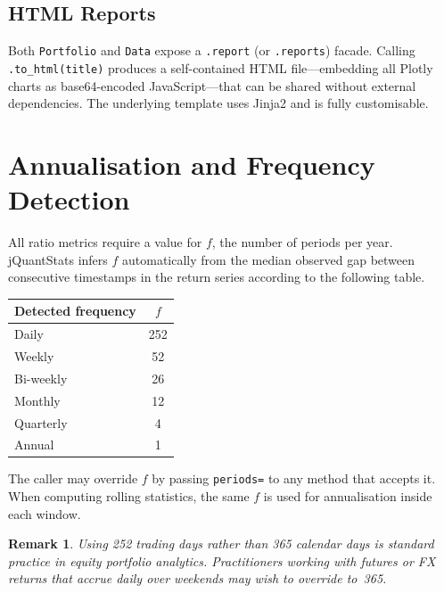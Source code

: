 \documentclass[11pt,a4paper]{article}
\newtheorem{remark}{Remark}
\begin{document}
\subsection{HTML Reports}

Both \texttt{Portfolio} and \texttt{Data} expose a \texttt{.report} (or
\texttt{.reports}) facade.  Calling \texttt{.to\_html(title)} produces a
self-contained HTML file—embedding all Plotly charts as base64-encoded
JavaScript—that can be shared without external dependencies.  The underlying
template uses Jinja2 and is fully customisable.

\section{Annualisation and Frequency Detection}
\label{sec:annualisation}

All ratio metrics require a value for $f$, the number of periods per year.
jQuantStats infers $f$ automatically from the median observed gap between
consecutive timestamps in the return series according to the following table.

\begin{center}
\begin{tabular}{@{}lc@{}}
\toprule
Detected frequency & $f$ \\
\midrule
Daily         & 252 \\
Weekly        & 52  \\
Bi-weekly     & 26  \\
Monthly       & 12  \\
Quarterly     & 4   \\
Annual        & 1   \\
\bottomrule
\end{tabular}
\end{center}

The caller may override $f$ by passing \texttt{periods=} to any method that
accepts it.  When computing rolling statistics, the same $f$ is used for
annualisation inside each window.

\begin{remark}
Using 252 trading days rather than 365 calendar days is standard practice in
equity portfolio analytics.  Practitioners working with futures or FX returns
that accrue daily over weekends may wish to override to~365.
\end{remark}
\end{document}
